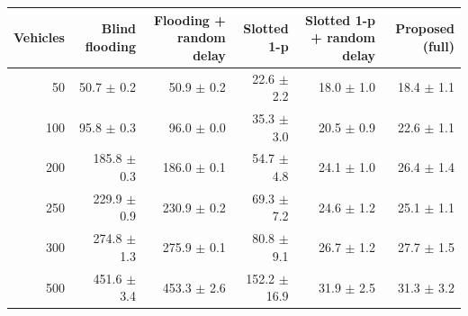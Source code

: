 \scriptsize
\renewcommand{\arraystretch}{1.2}
\begin{tabular}{rrrrrr}
\toprule
Vehicles & Blind flooding & Flooding + random delay & Slotted 1-p & Slotted 1-p + random delay & Proposed (full) \\
\midrule
50 & 50.7 $\pm$ 0.2 & 50.9 $\pm$ 0.2 & 22.6 $\pm$ 2.2 & 18.0 $\pm$ 1.0 & 18.4 $\pm$ 1.1 \\
100 & 95.8 $\pm$ 0.3 & 96.0 $\pm$ 0.0 & 35.3 $\pm$ 3.0 & 20.5 $\pm$ 0.9 & 22.6 $\pm$ 1.1 \\
200 & 185.8 $\pm$ 0.3 & 186.0 $\pm$ 0.1 & 54.7 $\pm$ 4.8 & 24.1 $\pm$ 1.0 & 26.4 $\pm$ 1.4 \\
250 & 229.9 $\pm$ 0.9 & 230.9 $\pm$ 0.2 & 69.3 $\pm$ 7.2 & 24.6 $\pm$ 1.2 & 25.1 $\pm$ 1.1 \\
300 & 274.8 $\pm$ 1.3 & 275.9 $\pm$ 0.1 & 80.8 $\pm$ 9.1 & 26.7 $\pm$ 1.2 & 27.7 $\pm$ 1.5 \\
500 & 451.6 $\pm$ 3.4 & 453.3 $\pm$ 2.6 & 152.2 $\pm$ 16.9 & 31.9 $\pm$ 2.5 & 31.3 $\pm$ 3.2 \\
\bottomrule
\end{tabular}
